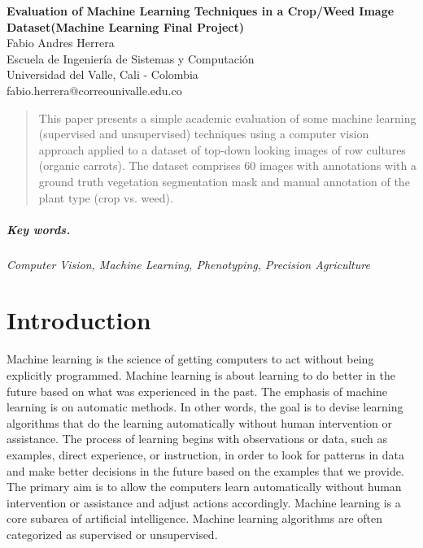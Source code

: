 \documentclass[12pt]{article}
\numberwithin{equation}{section}
\numberwithin{table}{section}
\numberwithin{figure}{section}
\begin{document}

\begin{center}
\textbf{\Large Evaluation of Machine Learning Techniques in a Crop/Weed Image Dataset\newline(Machine Learning Final Project)} \\[6pt]
  Fabio Andres Herrera \\[6pt]
  Escuela de Ingeniería de Sistemas y Computación\\
  Universidad del Valle, Cali - Colombia  \\[6pt]
  fabio.herrera@correounivalle.edu.co
\end{center}

\begin{abstract}
\noindent	
This paper presents a simple academic evaluation of some machine learning (supervised and unsupervised) techniques using a computer vision approach applied to a dataset of top-down looking images of row cultures (organic carrots). The dataset comprises 60 images with annotations with a ground truth vegetation segmentation mask and manual annotation of the plant type (crop vs. weed).


\end{abstract}

\subparagraph{\textit{Key words.}}\textit{Computer Vision, Machine Learning, Phenotyping, Precision Agriculture}



\section{Introduction}

Machine learning is the science of getting computers to act without being explicitly programmed\cite{5392560}. Machine learning is about learning to do better in the future based on what was experienced in the past. The emphasis of machine learning is on automatic methods. In other words, the goal is to devise learning algorithms that do the learning automatically without human intervention or assistance. The process of learning begins with observations or data, such as examples, direct experience, or instruction, in order to look for patterns in data and make better decisions in the future based on the examples that we provide. The primary aim is to allow the computers learn automatically without human intervention or assistance and adjust actions accordingly. Machine learning is a core subarea of artificial intelligence. Machine learning algorithms are often categorized as supervised or unsupervised.
\end{document}
